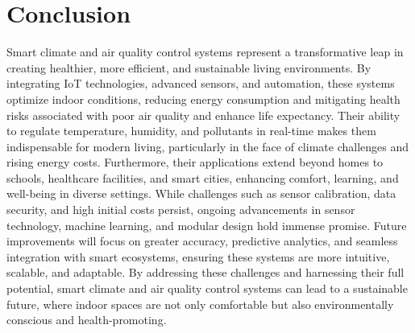\documentclass[USenglish,oneside,twocolumn]{article}
\begin{document}
\section{Conclusion}
Smart climate and air quality control systems represent a transformative leap in creating healthier, more efficient, and sustainable living environments. By integrating IoT technologies, advanced sensors, and automation, these systems optimize indoor conditions, reducing energy consumption and mitigating health risks associated with poor air quality and enhance life expectancy. Their ability to regulate temperature, humidity, and pollutants in real-time makes them indispensable for modern living, particularly in the face of climate challenges and rising energy costs. Furthermore, their applications extend beyond homes to schools, healthcare facilities, and smart cities, enhancing comfort, learning, and well-being in diverse settings. While challenges such as sensor calibration, data security, and high initial costs persist, ongoing advancements in sensor technology, machine learning, and modular design hold immense promise. Future improvements will focus on greater accuracy, predictive analytics, and seamless integration with smart ecosystems, ensuring these systems are more intuitive, scalable, and adaptable. By addressing these challenges and harnessing their full potential, smart climate and air quality control systems can lead to a sustainable future, where indoor spaces are not only comfortable but also environmentally conscious and health-promoting.

\printbibliography[title={References}]
\end{document}
